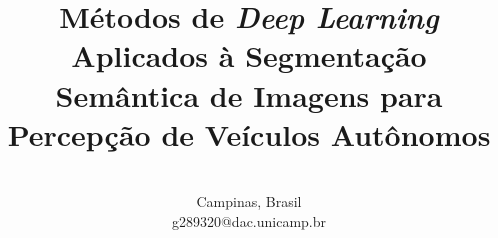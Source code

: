 \documentclass[conference]{IEEEtran}
\newenvironment{note}{
	\color{gray}
}
\begin{document}
\title{\huge{Métodos de \textit{Deep Learning} Aplicados à Segmentação Semântica de Imagens para Percepção de Veículos Autônomos}}

\author{
\\
Campinas, Brasil \\
g289320@dac.unicamp.br}

\maketitle

\begin{abstract}


No contexto de veículos autônomos, a percepção do ambiente urbano se faz peça chave para a viabilidade, desempenho e segurança da aplicação da presença dos mesmos na sociedade. Nesse âmbito, a visão computacional por meio de técnicas como segmentação semântica de imagens consegue entender o ambiente, e com isso conseguir distinguir área navegável de obstáculos. Existem soluções para tal tarefa, que empregam a necessidade de grande pré-processamento dos dados, porém, métodos de \textit{deep learing} permitem que a segmentação semântica seja realizada em tempo real, aprendendo diretamente dos dados brutos. Nesse sentido, este trabalho aplica uma rede neural profunda com arquitetura \textit{two-branch} baseada na rede STDC para segmentação semântica de imagens com uso do \textit{dataset} Cityscapes e validação com imagens capturadas pelo autor. Dessa forma, foi visto que o desempenho da rede STDC foi satisfatório, chegando a valores de mIoU dentro do estado da arte, e que o treinamento da rede por meio do \textit{dataset}, ao ser aplicado em imagens obtidas pelo autor apresentou erros em relação a entidades muito diferentes das vistas no treinamento. Dessa forma, a verificação da necessidade \textit{fine tunning} com dados locais pode ser importante para o desempenho e confiabilidade da solução.

\end{abstract}
\end{document}

